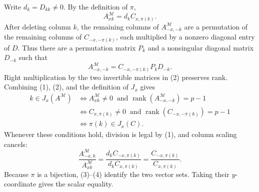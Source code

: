 Write \(d_k=D_{kk}\ne0\). By the definition of \(\pi\),
\[
A^{\mathcal M}_{xk}=d_kC_{x,\pi(k)}. \tag{1}
\]
After deleting column \(k\), the remaining columns of \(A^{\mathcal M}_{-x,-k}\) are a permutation of the remaining columns of \(C_{-x,-\pi(k)}\), each multiplied by a nonzero diagonal entry of \(D\). Thus there are a permutation matrix \(P_k\) and a nonsingular diagonal matrix \(D_{-k}\) such that
\[
A^{\mathcal M}_{-x,-k}=C_{-x,-\pi(k)}P_kD_{-k}. \tag{2}
\]
Right multiplication by the two invertible matrices in (2) preserves rank. Combining (1), (2), and the definition of \(J_x\) gives
\[
\begin{aligned}
k\in J_x(A^{\mathcal M})
&\Longleftrightarrow
A^{\mathcal M}_{xk}\ne0\ \text{ and }
\operatorname{rank}(A^{\mathcal M}_{-x,-k})=p-1\\
&\Longleftrightarrow
C_{x,\pi(k)}\ne0\ \text{ and }
\operatorname{rank}(C_{-x,-\pi(k)})=p-1\\
&\Longleftrightarrow \pi(k)\in J_x(C). \tag{3}
\end{aligned}
\]
Whenever these conditions hold, division is legal by (1), and column scaling cancels:
\[
\frac{A^{\mathcal M}_{-x,k}}{A^{\mathcal M}_{xk}}
=\frac{d_kC_{-x,\pi(k)}}{d_kC_{x,\pi(k)}}
=\frac{C_{-x,\pi(k)}}{C_{x,\pi(k)}}. \tag{4}
\]
Because \(\pi\) is a bijection, (3)--(4) identify the two vector sets. Taking their \(y\)-coordinate gives the scalar equality.